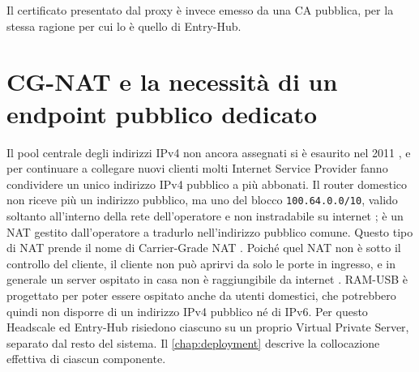 Il certificato presentato dal proxy è invece emesso da una CA pubblica, per la stessa ragione per cui lo
è quello di Entry-Hub.

\section{CG-NAT e la necessità di un endpoint pubblico dedicato}

Il pool centrale degli indirizzi IPv4 non ancora assegnati si è esaurito nel 2011 \cite{icann-ipv4-2011}, e
per continuare a collegare nuovi clienti molti Internet Service Provider fanno condividere un unico
indirizzo IPv4 pubblico a più abbonati. Il router domestico non riceve più un indirizzo pubblico, ma uno
del blocco \texttt{100.64.0.0/10}, valido soltanto all'interno della rete dell'operatore e non
instradabile su internet \cite{rfc6598}; è un NAT gestito dall'operatore a tradurlo nell'indirizzo
pubblico comune. Questo tipo di NAT prende il nome di Carrier-Grade NAT \cite{rfc6888}.
Poiché quel NAT non è sotto il controllo del cliente, il cliente non può aprirvi da solo le porte in
ingresso, e in generale un server ospitato in casa non è raggiungibile da internet \cite{rfc6269}.
RAM-USB è progettato per poter essere ospitato anche da utenti domestici, che potrebbero quindi non
disporre di un indirizzo IPv4 pubblico né di IPv6. Per questo Headscale ed Entry-Hub risiedono ciascuno su
un proprio Virtual Private Server, separato dal resto del sistema. Il \autoref{chap:deployment} descrive la collocazione effettiva di ciascun componente.
